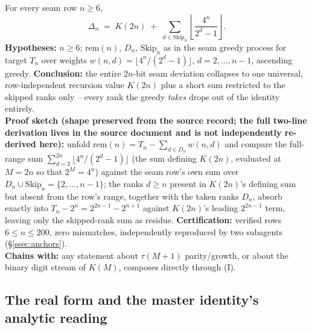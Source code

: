 \begin{thm}
\label{thm:master-identity}
For every seam row $n \ge 6$,
\begin{equation*}
\Delta_n \;=\; K(2n) \;+\; \sum_{d \in \mathrm{Skip}_n} \left\lfloor \frac{4^n}{2^d-1} \right\rfloor.
\tag{I}
\end{equation*}
\textbf{Hypotheses:} $n \ge 6$; $\mathrm{rem}(n)$, $D_n$, $\mathrm{Skip}_n$ as in the seam greedy
process for target $T_n$ over weights $w(n,d) = \lfloor 4^n/(2^d-1) \rfloor$, $d=2,\dots,n-1$,
ascending greedy. \textbf{Conclusion:} the entire $2n$-bit seam deviation collapses to one universal,
row-independent recursion value $K(2n)$ plus a short sum restricted to the skipped ranks only --
every rank the greedy \emph{takes} drops out of the identity entirely.
  \\
\textbf{Proof sketch (shape preserved from the source record; the full two-line derivation lives in
the source document and is not independently re-derived here):} unfold
$\mathrm{rem}(n) = T_n - \sum_{d \in D_n} w(n,d)$ and compare the full-range sum
$\sum_{d=2}^{2n} \lfloor 4^n/(2^d-1)\rfloor$ (the sum defining $K(2n)$, evaluated at $M=2n$ so that
$2^M = 4^n$) against the seam row's own sum over $D_n \cup \mathrm{Skip}_n = \{2,\dots,n-1\}$; the
ranks $d \ge n$ present in $K(2n)$'s defining sum but absent from the row's range, together with the
taken ranks $D_n$, absorb exactly into $T_n - 2^n = 2^{2n-1}-2^{n+1}$ against $K(2n)$'s leading
$2^{2n-1}$ term, leaving only the skipped-rank sum as residue. \textbf{Certification:} verified rows
$6\le n\le200$, zero mismatches, independently reproduced by two subagents (\S\ref{ssec:anchors}).\\
\textbf{Chains with:} any statement about $\tau(M+1)$ parity/growth, or about the binary digit stream
of $K(M)$, composes directly through (I).
\end{thm}

\subsection{The real form and the master identity's analytic reading}

